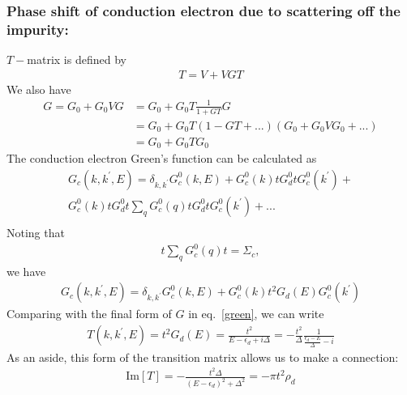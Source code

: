\documentclass[twoside]{report}
\numberwithin{equation}{section}
\begin{document}
\subsubsection{Phase shift of conduction electron due to scattering off the impurity:}
\(T-\)matrix is defined by
\begin{equation}\begin{aligned}
T = V + VGT 
\end{aligned}\end{equation}
We also have
\begin{equation}\begin{aligned}
G = G_0 + G_0VG &= G_0 + G_0 T \frac{1}{1+GT}G \\
        &= G_0 + G_0T(1-GT+...)(G_0+G_0VG_0+...)\\
        &= G_0 + G_0 T G_0 \label{green}
\end{aligned}\end{equation}
The conduction electron Green's function can be calculated as
\begin{equation}\begin{aligned}
G_c(k,k^\prime,E) = \delta_{k,k^\prime}G^0_c(k,E) + G_c^0(k)t G^0_d t G^0_c(k^\prime) + \\ G_c^0(k)t G^0_d t \sum_q G_c^0(q) t G^0_d t G^0_c(k^\prime) + ...\\
\end{aligned}\end{equation}
Noting that 
\begin{equation}\begin{aligned}
t\sum_q G_c^0(q)t = \Sigma_c,
\end{aligned}\end{equation}
we have
\begin{equation}\begin{aligned}
G_c(k,k^\prime,E) = \delta_{k,k^\prime}G^0_c(k,E) + G_c^0(k)t^2 G_d(E)G_c^0(k^\prime)
\end{aligned}\end{equation}
Comparing with the final form of \(G\) in eq.~\ref{green}, we can write
\begin{equation}\begin{aligned}
	\label{tm}
T(k,k^\prime,E) = t^2 G_d(E) = \frac{t^2}{E-\epsilon_d + i\Delta}=-\frac{t^2}{\Delta} \frac{1}{\frac{ \epsilon_d- E}{\Delta}-i}
\end{aligned}\end{equation}
As an aside, this form of the transition matrix allows us to make a connection:
\begin{equation}\begin{aligned}
	\label{dsfromtmat}
	\text{Im}[T] = -\frac{t^2 \Delta}{\left(E-\epsilon_d\right)^2+\Delta^2} = -\pi t^2 \rho_d
\end{aligned}\end{equation}
\end{document}

